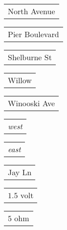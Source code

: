 \documentclass{book}
\begin{document}
\stopmpxshipout
\mpxshipout%
{\small \renewcommand{\arraystretch}{.9}
              \circuitfont\begin{tabular}{@{}l@{}}
                  North Avenue   
              \end{tabular}}%
\stopmpxshipout
\mpxshipout%
{\small \renewcommand{\arraystretch}{.9}
              \circuitfont\begin{tabular}{@{}l@{}}
                  Pier Boulevard   
              \end{tabular}}%
\stopmpxshipout
\mpxshipout%
{\small \renewcommand{\arraystretch}{.9}
              \circuitfont\begin{tabular}[b]{@{}c@{}}
                  Shelburne St     
              \end{tabular}}%
\stopmpxshipout
\mpxshipout%
{\small \renewcommand{\arraystretch}{.9}
              \circuitfont\begin{tabular}[t]{@{}r@{}}
                  Willow     
              \end{tabular}}%
\stopmpxshipout
\mpxshipout%
{\small \renewcommand{\arraystretch}{.9}
              \circuitfont\begin{tabular}[t]{@{}c@{}}
                  Winooski Ave     
              \end{tabular}}%
\stopmpxshipout
\mpxshipout%
{\small \renewcommand{\arraystretch}{.9}
              \begin{tabular}[t]{@{}r@{}}
                  \textit{west}     
              \end{tabular}}%
\stopmpxshipout
\mpxshipout%
{\small \renewcommand{\arraystretch}{.9}
              \begin{tabular}{@{}l@{}}
                  \textit{east}     
              \end{tabular}}%
\stopmpxshipout
\mpxshipout%
{\small \renewcommand{\arraystretch}{.9}
              \circuitfont\begin{tabular}{@{}r@{}}
                  Jay Ln     
              \end{tabular}}%
\stopmpxshipout
\mpxshipout%
{\small \renewcommand{\arraystretch}{.9}
                \circuitfont\begin{tabular}{@{}l}
                   $1.5$ volt 
	        \end{tabular}}%
\stopmpxshipout
\mpxshipout%
{\small \renewcommand{\arraystretch}{.9}
                \circuitfont\begin{tabular}[t]{@{}c}
                   $5$ ohm 
	        \end{tabular}}%
\end{document}
